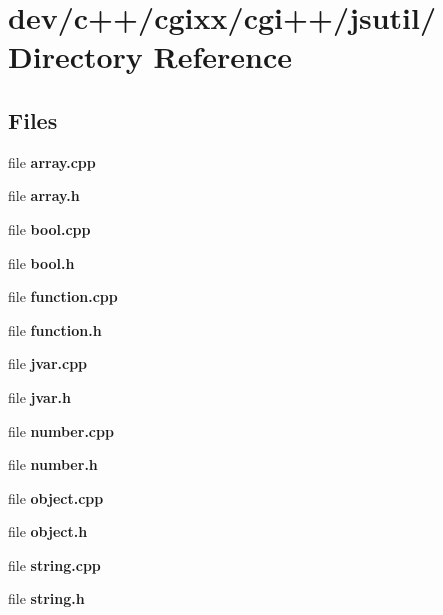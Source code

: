 \section{dev/c++/cgixx/cgi++/jsutil/ Directory Reference}
\label{dir_631f5d54aaf9fd2fa86240c9779b031d}
\subsection*{Files}
\begin{CompactItemize}
\item 
file \textbf{array.cpp}
\item 
file \textbf{array.h}
\item 
file \textbf{bool.cpp}
\item 
file \textbf{bool.h}
\item 
file \textbf{function.cpp}
\item 
file \textbf{function.h}
\item 
file \textbf{jvar.cpp}
\item 
file \textbf{jvar.h}
\item 
file \textbf{number.cpp}
\item 
file \textbf{number.h}
\item 
file \textbf{object.cpp}
\item 
file \textbf{object.h}
\item 
file \textbf{string.cpp}
\item 
file \textbf{string.h}
\end{CompactItemize}
